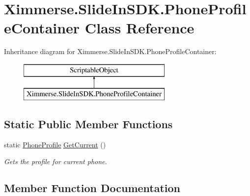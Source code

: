\hypertarget{class_ximmerse_1_1_slide_in_s_d_k_1_1_phone_profile_container}{}\section{Ximmerse.\+Slide\+In\+S\+D\+K.\+Phone\+Profile\+Container Class Reference}
\label{class_ximmerse_1_1_slide_in_s_d_k_1_1_phone_profile_container}
Inheritance diagram for Ximmerse.\+Slide\+In\+S\+D\+K.\+Phone\+Profile\+Container\+:\begin{figure}[H]
\begin{center}
\leavevmode
\includegraphics[height=2.000000cm]{class_ximmerse_1_1_slide_in_s_d_k_1_1_phone_profile_container}
\end{center}
\end{figure}
\subsection*{Static Public Member Functions}
\begin{DoxyCompactItemize}
\item 
static \mbox{\hyperlink{class_ximmerse_1_1_slide_in_s_d_k_1_1_phone_profile}{Phone\+Profile}} \mbox{\hyperlink{class_ximmerse_1_1_slide_in_s_d_k_1_1_phone_profile_container_a00a52ab66530f3e75e16fde887359b12}{Get\+Current}} ()
\begin{DoxyCompactList}\small\item\em Gets the profile for current phone. \end{DoxyCompactList}\end{DoxyCompactItemize}


\subsection{Member Function Documentation}
\mbox{\label{class_ximmerse_1_1_slide_in_s_d_k_1_1_phone_profile_container_a00a52ab66530f3e75e16fde887359b12}} 
